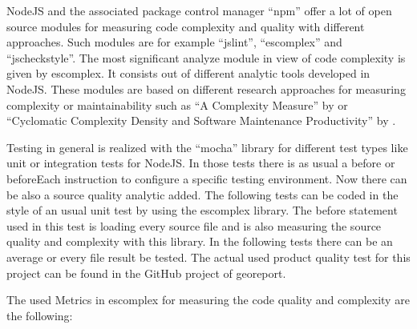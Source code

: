 \documentclass[DIV=calc,paper=a4,fontsize=9pt,twocolumn]{scrartcl}
\begin{document}
NodeJS and the associated package control manager \enquote{npm} offer a lot of open source modules for measuring code complexity and quality with different approaches. Such modules are for example \enquote{jslint}, \enquote{escomplex} and \enquote{jscheckstyle}. The most significant analyze module in view of code complexity is given by escomplex. It consists out of different analytic tools developed in NodeJS. These modules are based on different research approaches for measuring complexity or maintainability such as \enquote{A Complexity Measure} by \citet{mccabe1976complexity} or \enquote{Cyclomatic Complexity Density and Software Maintenance Productivity} by \citet{gill1991cyclomatic}.

Testing in general is realized with the \enquote{mocha} library for different test types like unit or integration tests for NodeJS. In those tests there is as usual a before or beforeEach instruction to configure a specific testing environment. Now there can be also a source quality analytic added. The following tests can be coded in the style of an usual unit test by using the escomplex library. The before statement used in this test is loading every source file and is also measuring the source quality and complexity with this library. In the following tests there can be an average or every file result be tested. The actual used product quality test for this project can be found in the GitHub project of georeport.

The used Metrics in escomplex for measuring the code quality and complexity are the following:
\end{document}
